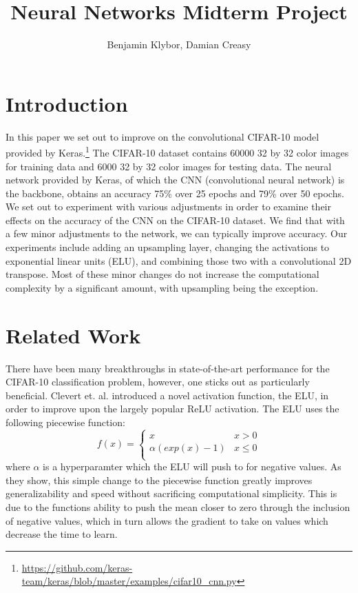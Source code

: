 \documentclass{article}
\title{Neural Networks Midterm Project}
\author{Benjamin Klybor, Damian Creasy}
\begin{document}
\maketitle

\section{Introduction}
In this paper we set out to improve on the convolutional CIFAR-10 model provided by Keras.\footnote{\url{https://github.com/keras-team/keras/blob/master/examples/cifar10_cnn.py}} The CIFAR-10 dataset contains 60000 32 by 32 color images for training data and 6000 32 by 32 color images for testing data. The neural network provided by Keras, of which the CNN (convolutional neural network) is the backbone, obtains an accuracy 75\% over 25 epochs and 79\% over 50 epochs. We set out to experiment with various adjustments in order to examine their effects on the accuracy of the CNN on the CIFAR-10 dataset. We find that with a few minor adjustments to the network, we can typically improve accuracy. Our experiments include adding an upsampling layer, changing the activations to exponential linear units (ELU), and combining those two with a convolutional 2D transpose. Most of these minor changes do not increase the computational complexity by a significant amount, with upsampling being the exception.

\section{Related Work}
There have been many breakthroughs in state-of-the-art performance for the CIFAR-10 classification problem, however, one sticks out as particularly beneficial. Clevert et. al. introduced a novel activation function, the ELU, in order to improve upon the largely popular ReLU activation. The ELU uses the following piecewise function:
\[   f(x)=\left\{
\begin{array}{ll}
      x & x > 0 \\
      \alpha (exp(x)-1) & x \leq 0 \\
\end{array} 
\right. \]
where $\alpha$ is a hyperparamter which the ELU will push to for negative values. As they show, this simple change to the piecewise function greatly improves generalizability and speed without sacrificing computational simplicity. This is due to the functions ability to push the mean closer to zero through the inclusion of negative values, which in turn allows the gradient to take on values which decrease the time to learn.
\end{document}
